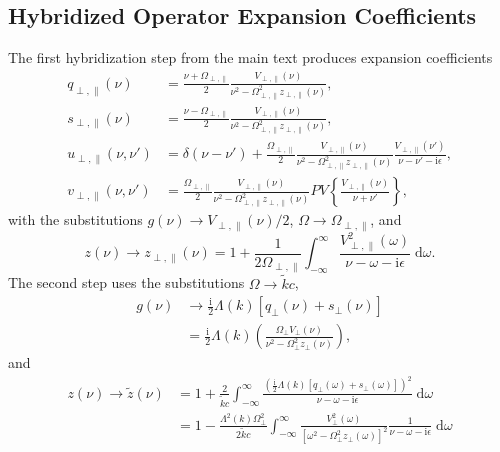 \subsection{Hybridized Operator Expansion Coefficients}

The first hybridization step from the main text produces expansion coefficients
\begin{equation}
\begin{split}
q_{\perp,\parallel}(\nu) &= \frac{\nu + \Omega_{\perp,\parallel}}{2}\frac{V_{\perp,\parallel}(\nu)}{\nu^2 - \Omega_{\perp,\parallel}^2z_{\perp,\parallel}(\nu)},\\
s_{\perp,\parallel}(\nu) &= \frac{\nu - \Omega_{\perp,\parallel}}{2}\frac{V_{\perp,\parallel}(\nu)}{\nu^2 - \Omega_{\perp,\parallel}^2z_{\perp,\parallel}(\nu)},\\
u_{\perp,\parallel}(\nu,\nu') &= \delta(\nu - \nu') + \frac{\Omega_{\perp,\parallel}}{2}\frac{V_{\perp,\parallel}(\nu)}{\nu^2 - \Omega_{\perp,\parallel}^2z_{\perp,\parallel}(\nu)}\frac{V_{\perp,\parallel}(\nu')}{\nu - \nu' - \mathrm{i}\epsilon},\\
v_{\perp,\parallel}(\nu,\nu') &= \frac{\Omega_{\perp,\parallel}}{2}\frac{V_{\perp,\parallel}(\nu)}{\nu^2 - \Omega^2_{\perp,\parallel}z_{\perp,\parallel}(\nu)}PV\left\{\frac{V_{\perp,\parallel}(\nu)}{\nu + \nu'}\right\},
\end{split}
\end{equation}
with the substitutions $g(\nu)\to V_{\perp,\parallel}(\nu)/2$, $\Omega\to\Omega_{\perp,\parallel}$, and
\begin{equation}
z(\nu) \to z_{\perp,\parallel}(\nu) = 1 + \frac{1}{2\Omega_{\perp,\parallel}}\int_{-\infty}^\infty\frac{V_{\perp,\parallel}^2(\omega)}{\nu - \omega - \mathrm{i}\epsilon}\;\mathrm{d}\omega.
\end{equation}
The second step uses the substitutions $\Omega\to\tilde{k}c$,
\begin{equation}
\begin{split}
g(\nu)&\to\frac{\mathrm{i}}{2}\Lambda(k)\left[q_\perp(\nu) + s_\perp(\nu)\right]\\
&= \frac{\mathrm{i}}{2}\Lambda(k)\left(\frac{\Omega_\perp V_\perp(\nu)}{\nu^2 - \Omega_\perp^2z_\perp(\nu)}\right),
\end{split}
\end{equation}
and
\begin{equation}
\begin{split}
z(\nu)\to\tilde{z}(\nu) &= 1 + \frac{2}{\tilde{k}c}\int_{-\infty}^\infty\frac{\left(\frac{\mathrm{i}}{2}\Lambda(k)[q_\perp(\omega) + s_\perp(\omega)]\right)^2}{\nu - \omega - \mathrm{i}\epsilon}\;\mathrm{d}\omega\\
&= 1 - \frac{\Lambda^2(k)\Omega_\perp^2}{2\tilde{k}c}\int_{-\infty}^\infty\frac{V_\perp^2(\omega)}{[\omega^2 - \Omega_\perp^2z_\perp(\omega)]^2}\frac{1}{\nu - \omega - \mathrm{i}\epsilon}\;\mathrm{d}\omega
\end{split}
\end{equation}
